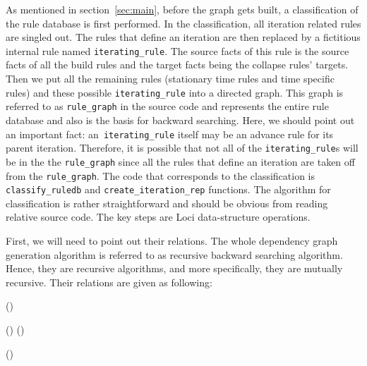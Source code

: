 \documentclass{article}
\begin{document}
As mentioned in section~\ref{sec:main}, before the graph gets built, a
classification of the rule database is first performed. In the
classification, all iteration related rules are singled out. The rules
that define an iteration are then replaced by a fictitious internal
rule named \texttt{iterating\_rule}. The source facts of this rule is
the source facts of all the build rules and the target facts being the
collapse rules' targets. Then we put all the remaining rules
(stationary time rules and time specific rules) and these possible
\texttt{iterating\_rule} into a directed graph. This graph is referred
to as \texttt{rule\_graph} in the source code and represents the
entire rule database and also is the basis for backward
searching. Here, we should point out an important fact:
an~\texttt{iterating\_rule} itself may be an advance rule for its
parent iteration. Therefore, it is possible that not all of the
\texttt{iterating\_rule}s will be in the the \texttt{rule\_graph}
since all the rules that define an iteration are taken off from the
\texttt{rule\_graph}. The code that corresponds to the
classification is \texttt{classify\_ruledb} and
\texttt{create\_iteration\_rep} functions. The algorithm for
classification is rather straightforward and should be
obvious from reading relative source code. The key steps are Loci
data-structure operations.


First, we will need to point out their relations. The whole dependency
graph generation algorithm is referred to as recursive backward
searching algorithm. Hence, they are recursive algorithms, and more
specifically, they are mutually recursive. Their relations are given
as following:

\begin{codebox}
\li  {}()
\end{codebox}

\begin{codebox}
\li  {}()
\li  {}()
\end{codebox}

\begin{codebox}
\li  {}()
\end{codebox}
\end{document}

